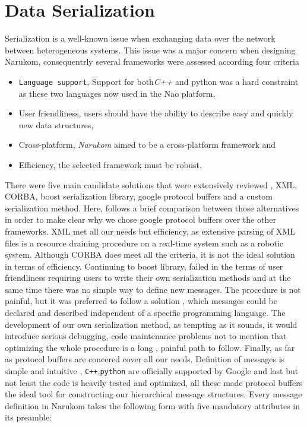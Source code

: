 \section{Data Serialization}
Serialization is a well-known issue when exchanging data over the network between heterogeneous systems. This issue was
a major concern when designing Narukom, consequentrly several frameworks  were assessed according four criteria
\begin{itemize}
\item { \tt Language support}, Support for both\textit{C++} and python  was a hard constraint as these two languages now used in the Nao platform,
\item User friendliness, users should have the ability to describe easy and quickly new data structures,
\item Cross-platform, \textit{Narukom} aimed to be a cross-platform framework and
\item Efficiency, the selected framework must be robust.
\end{itemize}
There were five main candidate solutions that were extensively reviewed , XML, CORBA, boost serialization library, google protocol buffers and a custom serialization method. Here, follows a brief comparison between those alternatives in order to make clear why we chose google protocol buffers over the other frameworks. XML met all our needs but efficiency, as extensive parsing of XML files is a resource draining procedure on a real-time system such as a robotic system. Although CORBA does meet all the criteria, it is not the ideal solution in terms of efficiency. Continuing  to boost library, failed in the terms of user friendliness requiring users to write their own serialization methods and at the same time there was no simple way to define new messages. The procedure is not painful, but it was preferred to follow a solution , which messages could be declared and described independent of a specific programming language. The development of our own serialization method, as tempting as it sounds, it would introduce serious debugging, code maintenance problems  not to mention that optimizing the whole procedure  is a long , painful path to follow. Finally, as far as protocol buffers are concered cover all our needs. Definition of messages is simple and intuitive , {\tt C++},{\tt python} are officially supported by Google and last but not least the code is heavily tested and optimized, all these made protocol buffers the ideal tool for constructing our hierarchical message structures.
Every message definition in Narukom takes the following form with five mandatory attributes in its preamble: 
